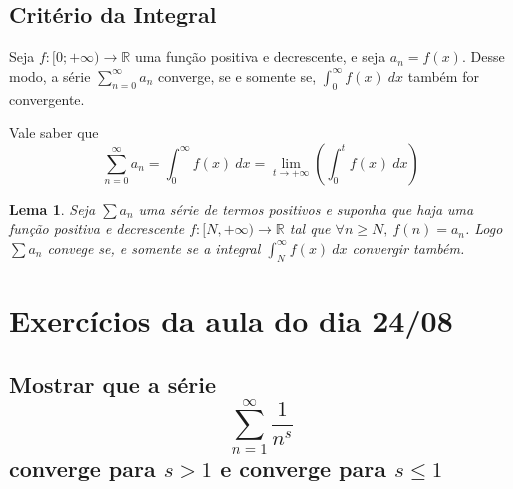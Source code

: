 \documentclass[12pt,openany]{book}
\newtheorem{lemma}{Lema}[section]
\begin{document}
\subsection{Critério da Integral}

\hspace{5mm} Seja $\displaystyle{f: [0;+\infty) \rightarrow \mathds{R}}$ uma função positiva e decrescente, e seja $a_n = f(x)$. Desse modo, a série $\displaystyle{\sum_{n=0}^{\infty} a_n}$ converge, se e somente se, $\displaystyle{\int_0^{\infty} f(x) \ dx}$ também for convergente. 

Vale saber que $$\sum_{n=0}^{\infty} a_n = \int_0^{\infty} f(x) \ dx = \lim_{t \rightarrow +\infty} \left( \int_0^t f(x) \ dx \right)$$

\begin{lemma}
Seja $\sum a_n$ uma série de termos positivos e suponha que haja uma função positiva e decrescente $f: [N, +\infty) \rightarrow \mathds{R}$ tal que $\forall n \geq N, \ f(n) = a_n$. Logo $\sum a_n$ convege se, e somente se a integral $\displaystyle{\int_N^{\infty}  f(x) \ dx }$ convergir também.
\end{lemma}

\section{Exercícios da aula do dia 24/08}
\label{sec:211}

\subsection*{Mostrar que a série $$\sum_{n = 1}^{\infty} \frac{1}{n^s}$$ converge para $s > 1$ e converge para $s \leq 1$}
\end{document}
